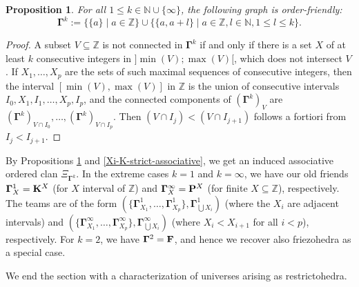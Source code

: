 \documentclass[11pt]{article}
\newtheorem{proposition}[theo]{Proposition}
\theoremstyle{definition}
\numberwithin{equation}{section}
\numberwithin{equation}{section}
\newcommand{\inc}{\subseteq}
\newcommand{\set}[1]{\{#1\}}
\newcommand{\setc}[2]{\set{#1 \mid #2}}
\newcommand{\union}{\cup}		%
\newcommand{\Union}{\bigcup}		%
\newcommand{\hyper}[1]{{\bf #1}}
\begin{document}
\begin{proposition} \label{Gamma-order-friendly}
For all   $1\leq k\in \mathbb{N}\cup\set{\infty}$, the following graph is order-friendly:
$$\mathbf{\Gamma}^k:=\setc{\set{a}}{a\in\mathbb{Z}}\union\setc{\set{a,a+l}}{a\in\mathbb{Z},l\in\mathbb{N},1\leq l\leq k}.$$
\end{proposition}
\begin{proof}
A subset $V\inc\mathbb{Z}$ is not connected in  $\mathbf{\Gamma}^k$ if  and only if there is a set $X$ of at least $k$ consecutive integers in $]\min(V);\max(V)[$, which does not intersect $V$.  
If $X_1,\ldots,X_p$ are the sets of such maximal sequences of consecutive integers, then the interval $[\min(V),\max(V)]$ in $\mathbb{Z}$ is the union of consecutive intervals $I_0,X_1,I_1,\ldots,X_p,I_p$, and the connected components of $(\mathbf{\Gamma}^k)_V$ are 
$(\mathbf{\Gamma}^k)_{V\cap I_0},\ldots,(\mathbf{\Gamma}^k)_{V\cap I_p}$. Then $(V\cap I_j)<(V\cap I_{j+1})$ follows a fortiori from $I_j<I_{j+1}$.
\end{proof}
By Propositions \ref{Gamma-order-friendly} and \ref{Xi-K-strict-associative}, we get an induced associative ordered clan $\Xi_{\mathbf{\Gamma}^k}$. 
In the extreme cases $k=1$ and $k=\infty$,  we have our old friends $\mathbf{\Gamma}^1_X=\hyper{K}^X$ (for $X$ interval of $\mathbb{Z}$) and $\mathbf{\Gamma}^\infty_X=\hyper{P}^X$ (for finite $X\inc\mathbb{Z}$), respectively.
The teams are of the form $(\{\mathbf{\Gamma}^1_{X_1},\ldots,\mathbf{\Gamma}^1_{X_p}\},\mathbf{\Gamma}^1_{\Union X_i})$ (where the $X_i$ are adjacent  intervals)  and $(\{\mathbf{\Gamma}^\infty_{X_1},\ldots,\mathbf{\Gamma}^\infty_{X_p}\},\mathbf{\Gamma}^\infty_{\Union X_i})$ (where $X_i<X_{i+1}$ for all $i<p$), respectively.  For $k=2$,
 we have $\mathbf{\Gamma}^2=\hyper{F}$, and hence we recover also friezohedra as a special case.

We end the section with a  characterization of universes arising as restrictohedra.
 
\end{document}
